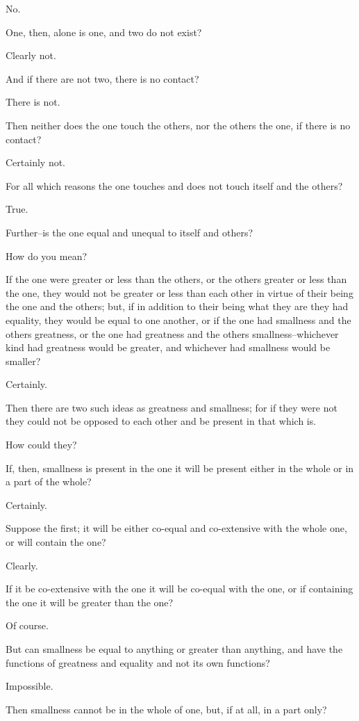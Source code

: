 No.

One, then, alone is one, and two do not exist?

Clearly not.

And if there are not two, there is no contact?

There is not.

Then neither does the one touch the others, nor the others the one, if
there is no contact?

Certainly not.

For all which reasons the one touches and does not touch itself and the
others?

True.

Further--is the one equal and unequal to itself and others?

How do you mean?

If the one were greater or less than the others, or the others greater
or less than the one, they would not be greater or less than each other
in virtue of their being the one and the others; but, if in addition to
their being what they are they had equality, they would be equal to one
another, or if the one had smallness and the others greatness, or the
one had greatness and the others smallness--whichever kind had greatness
would be greater, and whichever had smallness would be smaller?

Certainly.

Then there are two such ideas as greatness and smallness; for if they
were not they could not be opposed to each other and be present in that
which is.

How could they?

If, then, smallness is present in the one it will be present either in
the whole or in a part of the whole?

Certainly.

Suppose the first; it will be either co-equal and co-extensive with the
whole one, or will contain the one?

Clearly.

If it be co-extensive with the one it will be co-equal with the one, or
if containing the one it will be greater than the one?

Of course.

But can smallness be equal to anything or greater than anything, and
have the functions of greatness and equality and not its own functions?

Impossible.

Then smallness cannot be in the whole of one, but, if at all, in a part
only?


